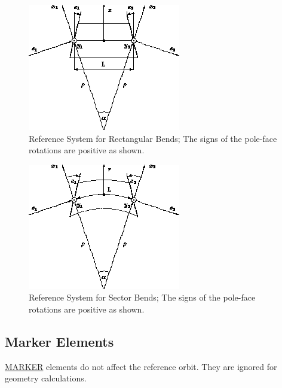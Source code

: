 \begin{figure}[htb]
  \centering
	\includegraphics{figures/ref_rbend.png}
  \caption{Reference System for Rectangular Bends; The signs of the pole-face rotations are positive as shown.}
\end{figure}

\begin{figure}[htb]
  \centering
	\includegraphics{figures/ref_sbend.png}
  \caption{Reference System for Sector Bends; The signs of the pole-face rotations are positive as shown.}
\end{figure}
\label{local_sbend}



\subsection{Marker Elements}
\href{marker.html}{MARKER} elements do not  affect the reference orbit. 
They are ignored for geometry calculations.  



